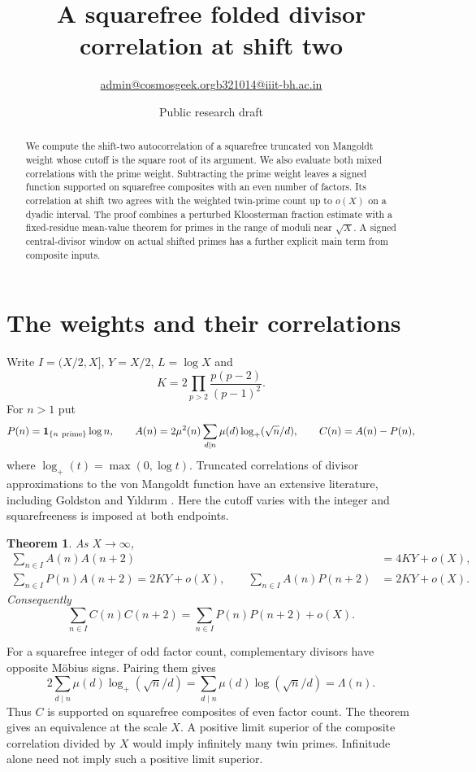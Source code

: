 \documentclass[11pt]{article}
\title{A squarefree folded divisor correlation at shift two}
\author{\small \href{mailto:admin@cosmosgeek.org}{admin@cosmosgeek.org}\qquad \href{mailto:b321014@iiit-bh.ac.in}{b321014@iiit-bh.ac.in}}
\date{Public research draft}
\newtheorem{theorem}{Theorem}
\begin{document}
\maketitle

\begin{abstract}
We compute the shift-two autocorrelation of a squarefree truncated
von Mangoldt weight whose cutoff is the square root of its argument.
We also evaluate both mixed correlations with the prime weight.
Subtracting the prime weight leaves a signed function supported on
squarefree composites with an even number of factors. Its correlation
at shift two agrees with the weighted twin-prime count up to $o(X)$
on a dyadic interval. The proof combines a perturbed Kloosterman
fraction estimate with a fixed-residue mean-value theorem for primes
in the range of moduli near $\sqrt X$. A signed central-divisor window on actual shifted primes has a further explicit main term from composite inputs.
\end{abstract}

\section{The weights and their correlations}
Write $I=(X/2,X]$, $Y=X/2$, $L=\log X$ and
\[
 K=2\prod_{p>2}\frac{p(p-2)}{(p-1)^2}.
\]
For $n>1$ put
\[
 P(n)=\mathbf1_{\{n\ {\rm prime}\}}\log n,\qquad
 A(n)=2\mu^2(n)\sum_{d\mid n}\mu(d)\log_+(\sqrt n/d),
 \qquad C(n)=A(n)-P(n),
\]
where $\log_+(t)=\max(0,\log t)$. Truncated correlations
of divisor approximations to the von Mangoldt function have an
extensive literature, including Goldston and Y{\i}ld{\i}r{\i}m
\cite{GY}. Here the cutoff varies with the integer and squarefreeness
is imposed at both endpoints.
\begin{theorem}\label{main}
As $X\to\infty$,
\begin{align}
 \sum_{n\in I}A(n)A(n+2)&=4KY+o(X), \label{aa}\\
 \sum_{n\in I}P(n)A(n+2)
  =2KY+o(X),\qquad
 \sum_{n\in I}A(n)P(n+2)&=2KY+o(X). \label{ap}
\end{align}
Consequently
\[
 \sum_{n\in I}C(n)C(n+2)
  =\sum_{n\in I}P(n)P(n+2)+o(X).
\]
\end{theorem}
For a squarefree integer of odd factor count, complementary divisors
have opposite M\"obius signs. Pairing them gives
\[
2\sum_{d\mid n}\mu(d)\log_+(\sqrt n/d)
 =\sum_{d\mid n}\mu(d)\log(\sqrt n/d)=\Lambda(n).
\]
Thus $C$ is supported on squarefree composites of even factor count.
The theorem gives an equivalence at the scale $X$. A positive
limit superior of the composite correlation divided by $X$
would imply infinitely many twin primes. Infinitude alone need
not imply such a positive limit superior.
\end{document}

